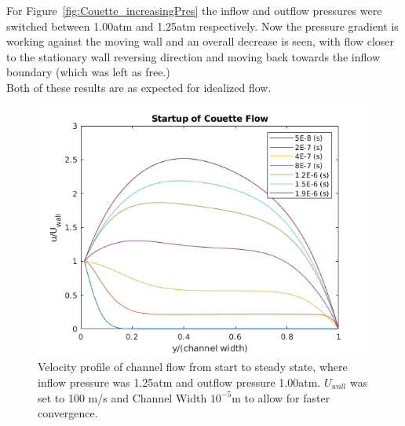 \documentclass[10pt,a4paper]{article}
\begin{document}
For Figure~\ref{fig:Couette_increasingPres} the inflow and outflow pressures were switched between 1.00atm and 1.25atm respectively. Now the pressure gradient is working against the moving wall and an overall decrease is seen, with flow closer to the stationary wall reversing direction and moving back towards the inflow boundary (which was left as free.)\\

Both of these results are as expected for idealized flow.\\




\begin{figure}[!htb]
	\begin{center}
		\includegraphics[scale=0.7]{images/FlowStartup_DecreasingPressure.png} 
		\caption{Velocity profile of channel flow from start to steady state, where inflow pressure was 1.25atm and outflow pressure 1.00atm. $U_{wall}$ was set to 100 m/s and Channel Width $10^{-5}$m to allow for faster convergence.}
		\label{fig:Couette_decreasingPres}
	\end{center}
\end{figure}
\end{document}

